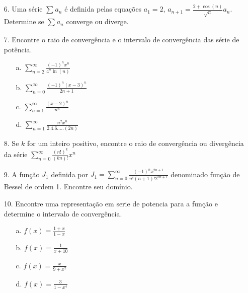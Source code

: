 \begin{itemize}
	\item[6.] Uma série $\sum_{}^{} a_{n}$ é definida pelas equações $a_{1}=2$, $a_{n+1}=\frac{2+\cos (n)}{\sqrt{n}}a_{n}$. Determine se $\sum_{}^{} a_{n}$ converge ou diverge.
\end{itemize}
\begin{itemize}
	\item[7.] Encontre o raio de convergência e o intervalo de convergência das série de potência.
	\begin{itemize}
		\item[a.] $\sum_{n=2}^{\infty}\frac{(-1)^{n}x^{n}}{4^{n}\ln (n)}$
		\item[b.] $\sum_{n=0}^{\infty}\frac{(-1)^{n}(x-3)^{n}}{2n+1}$
		\item[c.] $\sum_{n=1}^{\infty}\frac{(x-2)^{n}}{n^{n}}$
	    \item[d.] $\sum_{n=1}^{\infty}\frac{n^{2}x^{n}}{2.4.6. ... .(2n)}$
	\end{itemize}
\end{itemize}
\begin{itemize}
	\item[8.]  Se $k$ for um inteiro positivo, encontre o raio de convergência  ou divergência da série $\sum_{n=0}^{\infty}\frac{(n!)^{k}}{(kn)!}x^{n}$ 
\end{itemize}
\begin{itemize}
	\item[9.] A função $J_{1}$ definida por $J_{1}=\sum_{n=0}^{\infty}\frac{(-1)^{n}x^{2n+1}}{n!(n+1)!2^{2n+1}}$ denominado função de Bessel de ordem 1. Encontre seu domínio.
\end{itemize}
\begin{itemize}
	\item[10.]Encontre uma representação em serie de potencia para a função e determine o intervalo de convergência.
	 \begin{itemize}
	 	\item[a.] $f(x)=\frac{1+x}{1-x}$
	 	\item[b.] $f(x)=\frac{1}{x+10}$
	 	\item[c.] $f(x)=\frac{x}{9+x^{2}}$
	 	\item[d.] $f(x)=\frac{3}{1-x^{4}}$
	 \end{itemize}
\end{itemize}
